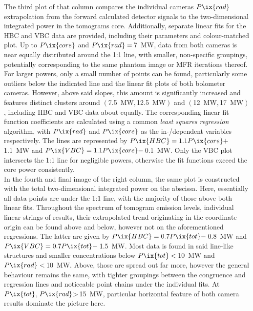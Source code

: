                 The third plot of that column compares the individual cameras $P\ix{rad}$ extrapolation from the forward calculated detector signals to the two-dimensional integrated power in the tomograms core. Additionally, separate linear fits for the HBC and VBC data are provided, including their parameters and colour-matched plot. Up to $P\ix{core}$ and $P\ix{rad}=$\,\SI{7}{\mega\watt}, data from both cameras is near equally distributed around the 1:1 line, with smaller, non-specific groupings, potentially corresponding to the same phantom image or MFR iterations thereof. For larger powers, only a small number of points can be found, particularly some outliers below the indicated line and the linear fit plots of both bolometer cameras. However, above said slopes, this amount is significantly increased and features distinct clusters around $\left(\right.$\SI{7.5}{\mega\watt},\,\SI{12.5}{\mega\watt}$\left.\right)$ and $\left(\right.$\SI{12}{\mega\watt},\,\SI{17}{\mega\watt}$\left.\right)$, including HBC and VBC data about equally. The corresponding linear fit function coefficients are calculated using a common \textit{least squares regression} algorithm, with $P\ix{rad}$ and $P\ix{core}$ as the in-/dependent variables respectively. The lines are represented by $P\ix{HBC}=1.1P\ix{core}+$\,\SI{1.1}{\mega\watt} and $P\ix{VBC}=1.1P\ix{core}-$\,\SI{0.1}{\mega\watt}. Only the VBC plot intersects the 1:1 line for negligible powers, otherwise the fit functions exceed the core power consistently.\\%
                In the fourth and final image of the right column, the same plot is constructed with the total two-dimensional integrated power on the abscissa. Here, essentially all data points are under the 1:1 line, with the majority of those above both linear fits. Throughout the spectrum of tomogram emission levels, individual linear strings of results, their extrapolated trend originating in the coordinate origin can be found above and below, however not on the aforementioned regressions. The latter are given by $P\ix{HBC}=0.7P\ix{tot}-$\,\SI{0.8}{\mega\watt} and $P\ix{VBC}=0.7P\ix{tot}-$\,\SI{1.5}{\mega\watt}. Most data is found in said line-like structures and smaller concentrations below $P\ix{tot}<$\,\SI{10}{\mega\watt} and $P\ix{rad}<$\,\SI{10}{\mega\watt}. Above, those are spread out far more, however the general behaviour remains the same, with tighter groupings between the congruence and regression lines and noticeable point chains under the individual fits. At $P\ix{tot}$,\,$P\ix{rad}$>\,\SI{15}{\mega\watt}, particular horizontal feature of both camera results dominate the picture here.\\%
